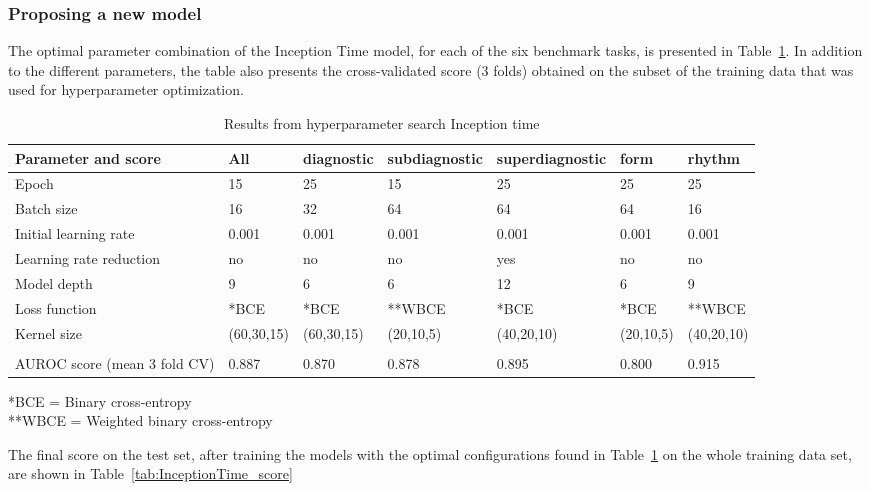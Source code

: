 \subsubsection{Proposing a new model}
The optimal parameter combination of the Inception Time model, for each of the six benchmark tasks, is presented in Table~\ref{tab:HPsearch}. In addition to the different parameters, the table also presents the cross-validated score (3 folds) obtained on the subset of the training data that was used for hyperparameter optimization. 


\begin{table}[hp]
\scriptsize
\centering
\caption{Results from hyperparameter search Inception time }
\begin{tabular}{lllllll}
\cellcolor[HTML]{C0C0C0}\textbf{Parameter and score } & \cellcolor[HTML]{C0C0C0}\textbf{All} &
\cellcolor[HTML]{C0C0C0}\textbf{diagnostic} &
\cellcolor[HTML]{C0C0C0}\textbf{subdiagnostic} &
\cellcolor[HTML]{C0C0C0}\textbf{superdiagnostic} &
\cellcolor[HTML]{C0C0C0}\textbf{form} &
\cellcolor[HTML]{C0C0C0}\textbf{rhythm} \\\hline
Epoch        & 15& 25& 15& 25& 25& 25 \\
Batch size        & 16& 32& 64& 64& 64 & 16  \\
Initial learning rate      & 0.001& 0.001& 0.001& 0.001& 0.001 & 0.001 \\
Learning rate reduction        & no& no& no& yes& no& no  \\
Model depth                & 9& 6& 6& 12& 6& 9 \\
Loss function          & *BCE& *BCE& **WBCE& *BCE& *BCE& **WBCE  \\
Kernel size     & (60,30,15)& (60,30,15)& (20,10,5)& (40,20,10)& (20,10,5)& (40,20,10)  \\\\
AUROC score (mean 3 fold CV)    & 0.887& 0.870& 0.878& 0.895& 0.800& 0.915  \\\hline 
\end{tabular}
\raggedright
*BCE = Binary cross-entropy\\
**WBCE = Weighted binary cross-entropy
\label{tab:HPsearch}
\end{table}

The final score on the test set, after training the models with the optimal configurations found in Table~\ref{tab:HPsearch} on the whole training data set, are shown in Table~\ref{tab:InceptionTime_score} 


